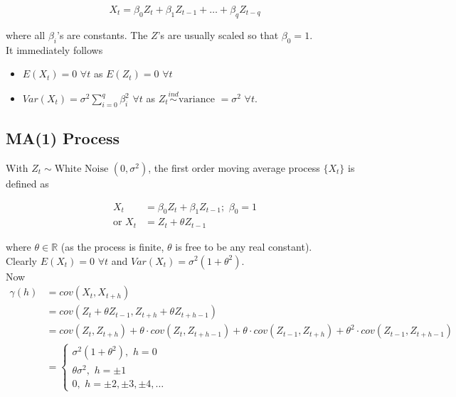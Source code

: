 \documentclass[11pt, a4paper]{article}
\begin{document}
\begin{equation}\label{maq}
X_t = \beta_0 Z_t + \beta_1 Z_{t-1} + \ldots + \beta_q Z_{t-q}
\end{equation}

where all $\beta_i$'s are constants. The $Z$'s are usually scaled so that $\beta_0 = 1$. \\[0.5em]

It immediately follows

\begin{itemize}
\item $E(X_t) = 0$ $\forall t$ as $E(Z_t) = 0$ $\forall t$

\item $Var(X_t) = \sigma^2 \sum \limits_{i = 0}^{q} \beta_{i}^{2}$ $\forall t$ as $Z_t \overset{ind}{\sim} \text{variance } = \sigma^2$ $\forall t$.
\end{itemize}

\subsection{MA(1) Process}

With $Z_t \sim \text{White Noise }(0, \sigma^2)$, the first order moving average process $\{X_t\}$ is defined as

\begin{align}
X_t &= \beta_0 Z_t + \beta_1 Z_{t-1}; \,\, \beta_0 = 1 \\[0.25em]
\text{or } X_t &= Z_t + \theta Z_{t-1}
\end{align}

where $\theta \in \mathbb{R}$ (as the process is finite, $\theta$ is free to be any real constant).\\


Clearly $E(X_t) = 0$ $\forall t$ and $Var(X_t) = \sigma^2 (1 + \theta^2)$. \\[0.25em]

Now 
\begin{align*}
\gamma(h) &= cov(X_t, X_{t+h}) \\[0.25em]
&= cov(Z_t + \theta Z_{t-1}, Z_{t+h} + \theta Z_{t+h-1}) \\[0.25em]
&= cov(Z_t, Z_{t+h}) + \theta \cdot cov(Z_t, Z_{t+h-1}) + \theta \cdot  cov(Z_{t-1}, Z_{t+h}) + \theta^2 \cdot cov(Z_{t-1}, Z_{t+h-1}) \\[0.25em]
&= \begin{cases}
\sigma^2 (1 + \theta^2), \,\, h = 0 \\[0.25em]
\theta \sigma^2 , \,\, h = \pm 1 \\[0.25em]
0, \,\, h = \pm 2, \pm 3, \pm 4, \ldots
\end{cases}
\end{align*}
\end{document}

